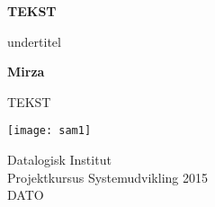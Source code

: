 \begin{titlepage}
    \begin{center}
        \vspace*{1cm}

        \Huge
        \textbf{TEKST}

        \vspace{0.5cm}
        \LARGE
        undertitel

        \vspace{1.5cm}

        \textbf{Mirza}\\

        \vspace{1.5cm}

        \vfill

        TEKST

        \vspace{0.8cm}

        \texttt{[image: sam1]}

        \Large
        Datalogisk Institut\\
        Projektkursus Systemudvikling 2015\\
        DATO

    \end{center}
\end{titlepage} 